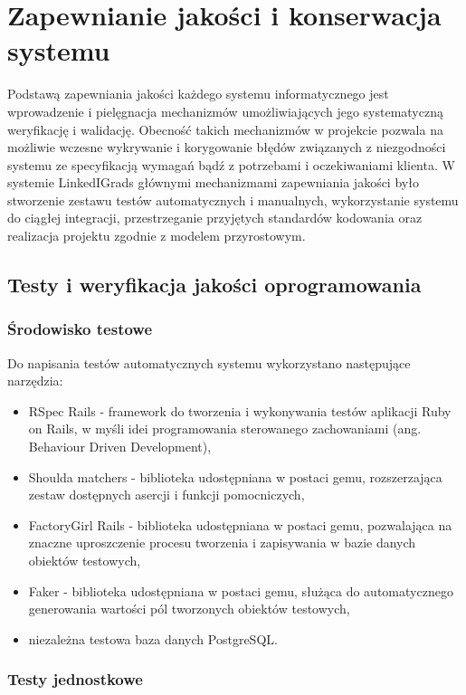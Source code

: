 \chapter{Zapewnianie jakości i konserwacja systemu}
\label{Chapter7}

Podstawą zapewniania jakości każdego systemu informatycznego jest wprowadzenie i pielęgnacja mechanizmów umożliwiających jego systematyczną weryfikację i walidację. Obecność takich mechanizmów w projekcie pozwala na możliwie wczesne wykrywanie i korygowanie błędów związanych z niezgodności systemu ze specyfikacją wymagań bądź z potrzebami i oczekiwaniami klienta. W systemie LinkedIGrads głównymi mechanizmami zapewniania jakości było stworzenie zestawu testów automatycznych i manualnych, wykorzystanie systemu do ciągłej integracji, przestrzeganie przyjętych standardów kodowania oraz realizacja projektu zgodnie z modelem przyrostowym.

\section{Testy i weryfikacja jakości oprogramowania}
\label{Chapter71}

\subsection{Środowisko testowe}

Do napisania testów automatycznych systemu wykorzystano następujące narzędzia:

\begin{itemize}
\item RSpec Rails - framework do tworzenia i wykonywania testów aplikacji Ruby on Rails, w myśli idei programowania sterowanego zachowaniami (ang. Behaviour Driven Development),
\item Shoulda matchers - biblioteka udostępniana w postaci gemu, rozszerzająca zestaw dostępnych asercji i funkcji pomocniczych,
\item FactoryGirl Rails - biblioteka udostępniana w postaci gemu, pozwalająca na znaczne uproszczenie procesu tworzenia i zapisywania w bazie danych obiektów testowych,
\item Faker - biblioteka udostępniana w postaci gemu, służąca do automatycznego generowania wartości pól tworzonych obiektów testowych, 
\item niezależna testowa baza danych PostgreSQL.
\end{itemize}

\subsection{Testy jednostkowe}
\label{Chapter711}

